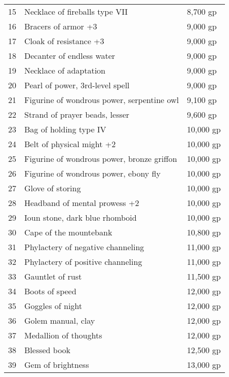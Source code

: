 \begin{table}[]
\begin{tabularx}{\linewidth}{lXl}
15  & Necklace of fireballs type VII              & 8,700 gp     \\
16  & Bracers of armor +3                         & 9,000 gp     \\
17  & Cloak of resistance +3                      & 9,000 gp     \\
18  & Decanter of endless water                   & 9,000 gp     \\
19  & Necklace of adaptation                      & 9,000 gp     \\
20  & Pearl of power, 3rd-level spell             & 9,000 gp     \\
21  & Figurine of wondrous power, serpentine owl  & 9,100 gp     \\
22  & Strand of prayer beads, lesser              & 9,600 gp     \\
23  & Bag of holding type IV                      & 10,000 gp    \\
24  & Belt of physical might +2                   & 10,000 gp    \\
25  & Figurine of wondrous power, bronze griffon  & 10,000 gp    \\
26  & Figurine of wondrous power, ebony fly       & 10,000 gp    \\
27  & Glove of storing                            & 10,000 gp    \\
28  & Headband of mental prowess +2               & 10,000 gp    \\
29  & Ioun stone, dark blue rhomboid              & 10,000 gp    \\
30  & Cape of the mountebank                      & 10,800 gp    \\
31  & Phylactery of negative channeling           & 11,000 gp    \\
32  & Phylactery of positive channeling           & 11,000 gp    \\
33  & Gauntlet of rust                            & 11,500 gp    \\
34  & Boots of speed                              & 12,000 gp    \\
35  & Goggles of night                            & 12,000 gp    \\
36  & Golem manual, clay                          & 12,000 gp    \\
37  & Medallion of thoughts                       & 12,000 gp    \\
38  & Blessed book                                & 12,500 gp    \\
39  & Gem of brightness                           & 13,000 gp    \\

\end{tabularx}
\end{table}
